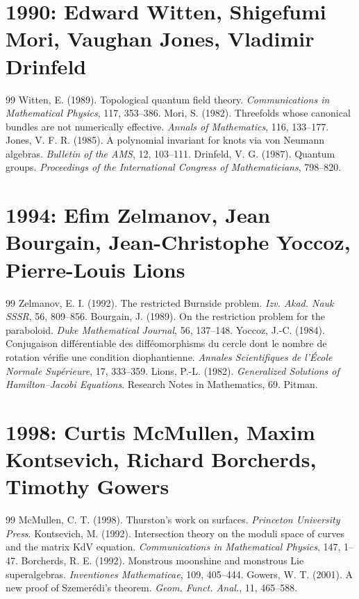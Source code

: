 \documentclass[12pt,a4paper]{book}
\theoremstyle{definition}
\theoremstyle{remark}
\begin{document}
\section*{1990: Edward Witten, Shigefumi Mori, Vaughan Jones, Vladimir Drinfeld}
\begin{thebibliography}{99}
 Witten, E. (1989). Topological quantum field theory. \emph{Communications in Mathematical Physics}, 117, 353--386.
 Mori, S. (1982). Threefolds whose canonical bundles are not numerically effective. \emph{Annals of Mathematics}, 116, 133--177.
 Jones, V. F. R. (1985). A polynomial invariant for knots via von Neumann algebras. \emph{Bulletin of the AMS}, 12, 103--111.
 Drinfeld, V. G. (1987). Quantum groups. \emph{Proceedings of the International Congress of Mathematicians}, 798--820.
\end{thebibliography}

\section*{1994: Efim Zelmanov, Jean Bourgain, Jean-Christophe Yoccoz, Pierre-Louis Lions}
\begin{thebibliography}{99}
 Zelmanov, E. I. (1992). The restricted Burnside problem. \emph{Izv. Akad. Nauk SSSR}, 56, 809--856.
 Bourgain, J. (1989). On the restriction problem for the paraboloid. \emph{Duke Mathematical Journal}, 56, 137--148.
 Yoccoz, J.-C. (1984). Conjugaison différentiable des difféomorphisms du cercle dont le nombre de rotation vérifie une condition diophantienne. \emph{Annales Scientifiques de l'\'Ecole Normale Sup\'erieure}, 17, 333--359.
 Lions, P.-L. (1982). \emph{Generalized Solutions of Hamilton--Jacobi Equations}. Research Notes in Mathematics, 69. Pitman.
\end{thebibliography}

\section*{1998: Curtis McMullen, Maxim Kontsevich, Richard Borcherds, Timothy Gowers}
\begin{thebibliography}{99}
 McMullen, C. T. (1998). Thurston's work on surfaces. \emph{Princeton University Press}.
 Kontsevich, M. (1992). Intersection theory on the moduli space of curves and the matrix KdV equation. \emph{Communications in Mathematical Physics}, 147, 1--47.
 Borcherds, R. E. (1992). Monstrous moonshine and monstrous Lie superalgebras. \emph{Inventiones Mathematicae}, 109, 405--444.
 Gowers, W. T. (2001). A new proof of Szemerédi's theorem. \emph{Geom. Funct. Anal.}, 11, 465--588.
\end{thebibliography}
\end{document}
